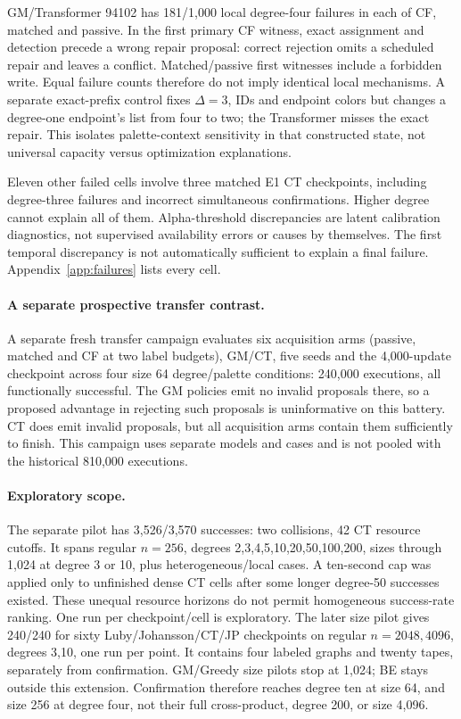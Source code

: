 \documentclass[10pt]{article}
\begin{document}
GM/Transformer 94102 has 181/1,000 local degree-four failures in each of CF,
matched and passive. In the first primary CF witness, exact assignment and
detection precede a wrong repair proposal: correct rejection omits a scheduled
repair and leaves a conflict. Matched/passive first witnesses include a
forbidden write. Equal failure counts therefore do not imply identical local
mechanisms. A separate exact-prefix control fixes $\Delta=3$, IDs and
endpoint colors but changes a degree-one endpoint's list from four to two;
the Transformer misses the exact repair. This isolates palette-context
sensitivity in that constructed state, not universal capacity versus
optimization explanations.



Eleven other failed cells involve three matched E1 CT checkpoints, including
degree-three failures and incorrect simultaneous confirmations. Higher degree
cannot explain all of them. Alpha-threshold discrepancies are latent
calibration diagnostics, not supervised availability errors or causes by
themselves. The first temporal discrepancy is not automatically sufficient
to explain a final failure. Appendix~\ref{app:failures} lists every cell.

\paragraph{A separate prospective transfer contrast.}
A separate fresh transfer campaign evaluates six acquisition arms
(passive, matched and CF at two label budgets), GM/CT, five seeds and
the 4,000-update checkpoint across four size 64 degree/palette conditions:
240,000 executions, all functionally successful.
The GM policies emit no invalid proposals there, so a proposed advantage
in rejecting such proposals is uninformative on this battery. CT does emit
invalid proposals, but all acquisition arms contain them sufficiently to finish.
This campaign uses separate models
and cases and is not pooled with the historical 810,000 executions.

\paragraph{Exploratory scope.}
The separate pilot has 3,526/3,570 successes: two collisions, 42 CT resource
cutoffs. It spans regular $n=256$, degrees 2,3,4,5,10,20,50,100,200, sizes
through 1,024 at degree 3 or 10, plus heterogeneous/local cases. A ten-second
cap was applied only to unfinished dense CT cells after some longer degree-50
successes existed. These unequal resource horizons do not permit homogeneous
success-rate ranking. One run per checkpoint/cell is exploratory.
The later size pilot gives 240/240 for sixty Luby/Johansson/CT/JP checkpoints
on regular $n=2048,4096$, degrees 3,10, one run per point. It contains four
labeled graphs and twenty tapes, separately from confirmation. GM/Greedy
size pilots stop at 1,024; BE stays outside this extension.
Confirmation therefore reaches degree ten at size 64, and size 256 at degree
four, not their full cross-product, degree 200, or size 4,096.
\end{document}
